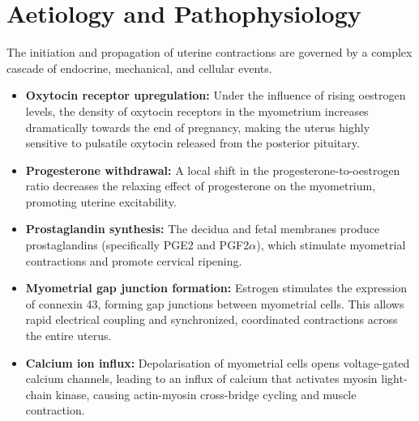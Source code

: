 \section*{Aetiology and Pathophysiology}
The initiation and propagation of uterine contractions are governed by a complex cascade of endocrine, mechanical, and cellular events.
\begin{itemize}
    \item \textbf{Oxytocin receptor upregulation:} Under the influence of rising oestrogen levels, the density of oxytocin receptors in the myometrium increases dramatically towards the end of pregnancy, making the uterus highly sensitive to pulsatile oxytocin released from the posterior pituitary.
    \item \textbf{Progesterone withdrawal:} A local shift in the progesterone-to-oestrogen ratio decreases the relaxing effect of progesterone on the myometrium, promoting uterine excitability.
    \item \textbf{Prostaglandin synthesis:} The decidua and fetal membranes produce prostaglandins (specifically PGE2 and PGF2$\alpha$), which stimulate myometrial contractions and promote cervical ripening.
    \item \textbf{Myometrial gap junction formation:} Estrogen stimulates the expression of connexin 43, forming gap junctions between myometrial cells. This allows rapid electrical coupling and synchronized, coordinated contractions across the entire uterus.
    \item \textbf{Calcium ion influx:} Depolarisation of myometrial cells opens voltage-gated calcium channels, leading to an influx of calcium that activates myosin light-chain kinase, causing actin-myosin cross-bridge cycling and muscle contraction.
\end{itemize}

